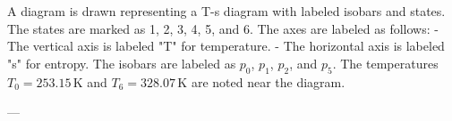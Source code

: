 A diagram is drawn representing a T-s diagram with labeled isobars and states. The states are marked as 1, 2, 3, 4, 5, and 6. The axes are labeled as follows:  
- The vertical axis is labeled "T" for temperature.  
- The horizontal axis is labeled "s" for entropy.  
The isobars are labeled as \( p_0 \), \( p_1 \), \( p_2 \), and \( p_5 \).  
The temperatures \( T_0 = 253.15 \, \text{K} \) and \( T_6 = 328.07 \, \text{K} \) are noted near the diagram.

---